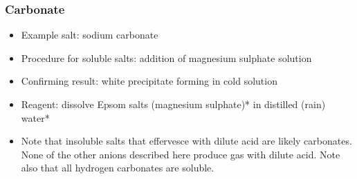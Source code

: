 \subsubsection{Carbonate}
\begin{itemize}
\item{Example salt: sodium carbonate}
\item{Procedure for soluble salts: addition of magnesium sulphate solution}
\item{Confirming result: white precipitate forming in cold solution}
\item{Reagent: dissolve Epsom salts (magnesium sulphate)* in distilled (rain) water*}

\item{Note that insoluble salts that effervesce with dilute acid are likely carbonates. 
None of the other anions described here produce gas with dilute acid. Note also that all hydrogen carbonates are soluble.}

\end{itemize}

